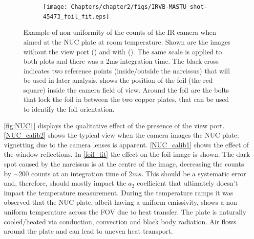 \begin{figure}
\begin{subfigure}{0.535\linewidth}
         \caption{}
         \label{NUC_calib1}
     \end{subfigure}
     \begin{subfigure}{0.7\linewidth}
         \centering
         \texttt{[image: Chapters/chapter2/figs/IRVB-MASTU\_shot-45473\_foil\_fit.eps]}
         \caption{}
         \label{foil_fit}
     \end{subfigure}
    \caption{Example of non uniformity of the counts of the IR camera when aimed at the NUC plate at room temperature. Shown are the images without the view port () and with (). The same scale is applied to both plots and there was a 2ms integration time. The black cross indicates two reference points (inside/outside the narcissus) that will be used in later analysis.  shows the position of the foil (the red square) inside the camera field of view. Around the foil are the bolts that lock the foil in between the two copper plates, that can be used to identify the foil orientation.}
    \label{fig:NUC1}
\end{figure}

\autoref{fig:NUC1} displays the qualitative effect of the presence of the view port. \autoref{NUC_calib2} shows the typical view when the camera images the NUC plate; vignetting due to the camera lenses is apparent. \autoref{NUC_calib1} shows the effect of the window reflections. In \autoref{foil_fit} the effect on the foil image is shown. The dark spot caused by the narcissus is at the centre of the image, decreasing the counts by $\sim$200 counts at an integration time of $2ms$. This should be a systematic error and, therefore, should mostly impact the $a_2$ coefficient that ultimately doesn't impact the temperature measurement.
During the temperature ramps it was observed that the NUC plate, albeit having a uniform emissivity, shows a non uniform temperature across the FOV due to heat transfer. The plate is naturally cooled/heated via conduction, convection and black body radiation. Air flows around the plate and can lead to uneven heat transport.

